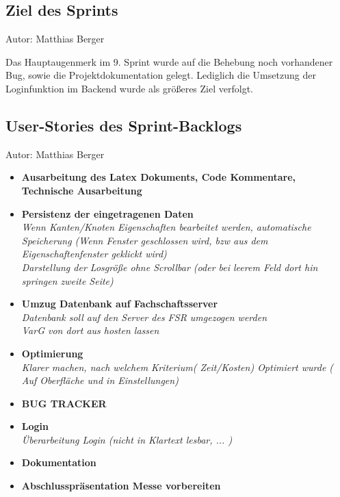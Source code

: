 
\subsection{Ziel des Sprints}
{\small Autor: Matthias Berger}

Das Hauptaugenmerk im 9. Sprint wurde auf die Behebung noch vorhandener Bug, sowie die Projektdokumentation gelegt. Lediglich die Umsetzung der Loginfunktion im Backend wurde als größeres Ziel verfolgt.

\subsection{User-Stories des Sprint-Backlogs}
{\small Autor: Matthias Berger}

\begin{itemize}
\item \textbf{Ausarbeitung des Latex Dokuments, Code Kommentare, Technische Ausarbeitung}

\item \textbf{Persistenz der eingetragenen Daten }
      \\\textit{Wenn Kanten/Knoten Eigenschaften bearbeitet werden, automatische Speicherung (Wenn Fenster geschlossen wird, bzw aus dem Eigenschaftenfenster geklickt wird)
      \\Darstellung der Losgröße ohne Scrollbar (oder bei leerem Feld dort hin springen zweite Seite)}

\item \textbf{Umzug Datenbank auf Fachschaftsserver}
      \\\textit{Datenbank soll auf den Server des FSR umgezogen werden
      \\VarG von dort aus hosten lassen}
       
\item \textbf{Optimierung}
      \\\textit{Klarer machen, nach welchem Kriterium( Zeit/Kosten) Optimiert wurde ( Auf Oberfläche und in Einstellungen)}
      
\item \textbf{BUG TRACKER}

\item \textbf{Login}
      \\\textit{Überarbeitung Login (nicht in Klartext lesbar, ... )}
      
\item \textbf{Dokumentation}

\item \textbf{Abschlusspräsentation Messe vorbereiten }
\end{itemize}

